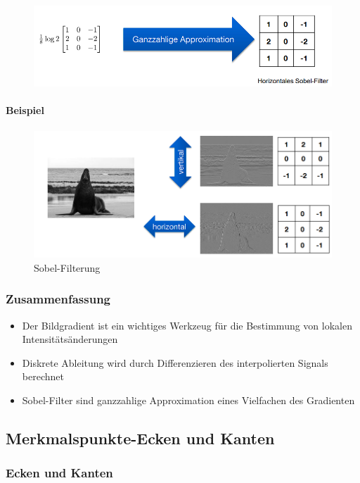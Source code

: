 \documentclass[12pt, a4paper, oneside]{article}
\begin{document}
\begin{figure}[htbp]
    \centering
    \includegraphics[scale=1]{../img/1-11.png}
    \label{img/1-11}
\end{figure}

\paragraph*{Beispiel}
\begin{figure}[!h]
    \centering
    \includegraphics[scale=0.6]{../img/1-12.png}
    \caption{Sobel-Filterung}
    \label{img/1-12}
\end{figure}

\subsubsection{Zusammenfassung}
\begin{itemize}
    \item Der Bildgradient ist ein wichtiges Werkzeug für die Bestimmung von lokalen Intensitätsänderungen
    \item Diskrete Ableitung wird durch Differenzieren des interpolierten Signals berechnet
    \item Sobel-Filter sind ganzzahlige Approximation eines Vielfachen des Gradienten 
\end{itemize}

\subsection{Merkmalspunkte-Ecken und Kanten}
\subsubsection{Ecken und Kanten}
\end{document}
